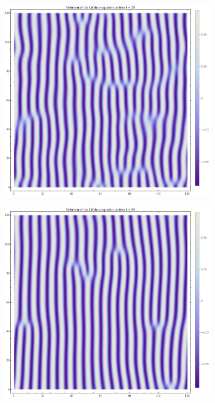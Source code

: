 \begin{figure}[htp]
\centering
\begin{subfigure}{.33\textwidth}
	\centering
	\includegraphics[width=.9\linewidth]{img/chap1/sol_Lif_t20.png}
	\caption{}
	\label{lif_t20}
	\end{subfigure}%
\begin{subfigure}{.33\textwidth}
	\centering
	\includegraphics[width=.9\linewidth]{img/chap1/sol_Lif_t60.png}
	\caption{}
	\label{lif_t60}
\end{subfigure}%
\begin{subfigure}{.33\textwidth}

\end{subfigure}
\end{figure}
